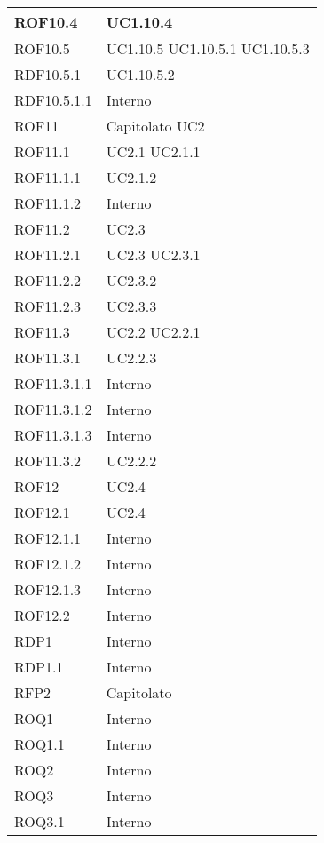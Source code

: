 \begin{center}
\begin{longtable}{| p{4cm} | p{4cm} |}
\hline
ROF10.4   &  UC1.10.4 \\
\hline
ROF10.5   &  UC1.10.5 \newline UC1.10.5.1 \newline UC1.10.5.3 \\
\hline
RDF10.5.1   &  UC1.10.5.2 \\
\hline
RDF10.5.1.1   &  Interno \\
\hline
ROF11   &  Capitolato \newline UC2 \\
\hline
ROF11.1   &  UC2.1 \newline UC2.1.1 \\
\hline
ROF11.1.1   &  UC2.1.2 \\
\hline
ROF11.1.2   &  Interno \\
\hline
ROF11.2   &  UC2.3  \\
\hline
ROF11.2.1   &  UC2.3 \newline UC2.3.1 \\
\hline
ROF11.2.2   &  UC2.3.2 \\
\hline
ROF11.2.3   &  UC2.3.3 \\
\hline
ROF11.3   &  UC2.2 \newline UC2.2.1 \\
\hline
ROF11.3.1   &  UC2.2.3 \\
\hline
ROF11.3.1.1   &  Interno \\
\hline
ROF11.3.1.2   &  Interno \\
\hline
ROF11.3.1.3   &  Interno \\
\hline
ROF11.3.2   &  UC2.2.2 \\
\hline
ROF12   &  UC2.4  \\
\hline
ROF12.1   &  UC2.4  \\
\hline
ROF12.1.1   &  Interno \\
\hline
ROF12.1.2   &  Interno \\
\hline
ROF12.1.3   &  Interno \\
\hline
ROF12.2   &  Interno \\
\hline
RDP1   &  Interno \\
\hline
RDP1.1   &  Interno \\
\hline
RFP2   &  Capitolato \\
\hline
ROQ1   &  Interno \\
\hline
ROQ1.1   &  Interno \\
\hline
ROQ2   &  Interno \\
\hline
ROQ3   &  Interno \\
\hline
ROQ3.1   &  Interno \\

\end{longtable}
\end{center}
